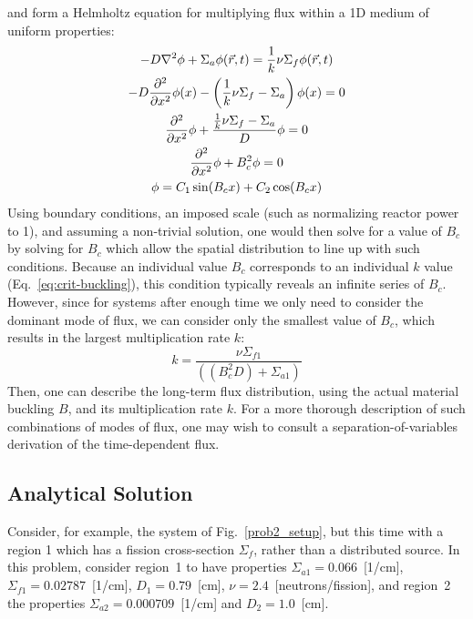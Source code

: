 \documentclass[12pt]{article}
\newcommand{\figref}[1]{Fig.~\ref{#1}}
\begin{document}
and form a Helmholtz equation for multiplying flux within a 1D medium of uniform properties:
\begin{equation}
    \label{eq:noncrit-mult}
    \begin{gathered}
        -D\nabla^2\phi + \Sigma_a\phi(\vec{r}, t) = \frac{1}{k}\nu\Sigma_f\phi(\vec{r}, t)
        \\
        -D\frac{\partial^2}{\partial x^2} \phi(x) - \left(\frac{1}{k}\nu\Sigma_f-\Sigma_a\right)\phi(x) = 0 \\
        \frac{\partial^2}{\partial x^2}\phi + \frac{\frac{1}{k}\nu\Sigma_f - \Sigma_a}{D}\phi = 0\\
        \frac{\partial^2}{\partial x^2}\phi + B_c^2\phi = 0\\
        \phi = C_1\sin(B_cx) + C_2\cos(B_cx)
    \end{gathered}
\end{equation}
Using boundary conditions, an imposed scale (such as normalizing reactor power to 1), and assuming a non-trivial solution, one would then solve for a value of $B_c$ by solving for $B_c$ which allow the spatial distribution to line up with such conditions.
Because an individual value $B_c$ corresponds to an individual $k$ value (Eq.~\ref{eq:crit-buckling}), this condition typically reveals an infinite series of $B_c$.
However, since for systems after enough time we only need to consider the dominant mode of flux, we can consider only the smallest value of $B_c$, which results in the largest multiplication rate $k$:
\begin{equation}
    \label{eq:k-buck}
    k=\frac{\nu \Sigma_{f1}}{\left(\left(B_c^{2} D\right)+\Sigma_{a1}\right)}
\end{equation}
Then, one can describe the long-term flux distribution, using the actual material buckling $B$, and its multiplication rate $k$.
For a more thorough description of such combinations of modes of flux, one may wish to consult a separation-of-variables derivation of the time-dependent flux\cite{novak_lecture11_2026}.

\subsection{Analytical Solution}
Consider, for example, the system of \figref{prob2_setup}, but this time with a region 1 which has a fission cross-section $\Sigma_f$, rather than a distributed source.
In this problem, consider region~1 to have properties $\Sigma_{a1}=0.066$~[1/cm], $\Sigma_{f1}=0.02787$~[1/cm], $D_1=0.79$~[cm], $\nu=2.4$~[neutrons/fission], and region~2 the properties $\Sigma_{a2}=0.000709$~[1/cm] and $D_2=1.0$~[cm]\cite{novak_computer_2026}. \\
\end{document}

